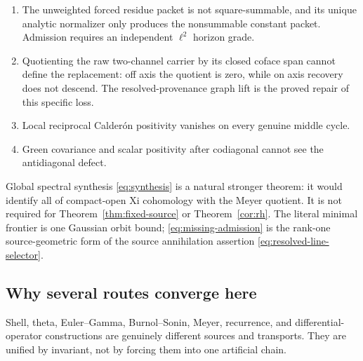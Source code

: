 \documentclass[11pt]{article}
\theoremstyle{definition}
\theoremstyle{remark}
\begin{document}
\begin{enumerate}[leftmargin=2.2em]
\item The unweighted forced residue packet is not square-summable, and its
      unique analytic normalizer only produces the nonsummable constant
      packet.  Admission requires an independent \(\ell^2\) horizon grade.
\item Quotienting the raw two-channel carrier by its closed coface span
      cannot define the replacement: off axis the quotient is zero, while on
      axis recovery does not descend.  The resolved-provenance graph lift is
      the proved repair of this specific loss.
\item Local reciprocal Calder\'on positivity vanishes on every genuine
      middle cycle.
\item Green covariance and scalar positivity after codiagonal cannot see
      the antidiagonal defect.
\end{enumerate}

Global spectral synthesis \eqref{eq:synthesis} is a natural stronger
theorem: it would identify all of compact-open Xi cohomology with the
Meyer quotient.  It is not required for
Theorem~\ref{thm:fixed-source} or Theorem~\ref{cor:rh}.  The literal minimal
frontier is one Gaussian orbit bound; \eqref{eq:missing-admission} is the
rank-one source-geometric form of the source annihilation assertion
\eqref{eq:resolved-line-selector}.

\subsection{Why several routes converge here}

Shell, theta, Euler--Gamma, Burnol--Sonin, Meyer, recurrence, and
differential-operator constructions are genuinely different sources and
transports.  They are unified by invariant, not by forcing them into one
artificial chain.
\end{document}
